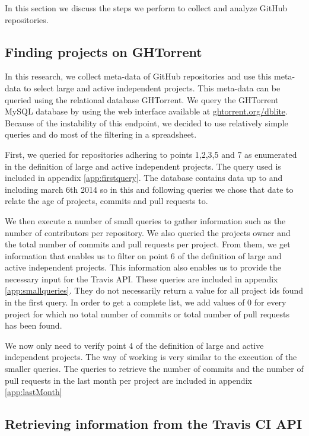 In this section we discuss the steps we perform to collect and analyze GitHub repositories.

\subsection{Finding projects on GHTorrent}
In this research, we collect meta-data of GitHub repositories and use this meta-data to select large and active independent projects.
This meta-data can be queried using the relational database GHTorrent. \cite{ghtorrent}
We query the GHTorrent MySQL database by using the web interface available at \url{ghtorrent.org/dblite}. 
Because of the instability of this endpoint, we decided to use relatively simple queries and do most of the filtering in a spreadsheet.

First, we queried for repositories adhering to points 1,2,3,5 and 7 as enumerated in the definition of large and active independent projects.
The query used is included in appendix \ref{app:firstquery}.
The database contains data up to and including march 6th 2014 so in this and following queries we chose that date to relate the age of projects, commits and pull requests to.

We then execute a number of small queries to gather information such as the number of contributors per repository. 
We also queried the projects owner and the total number of commits and pull requests per project. 
From them, we get information that enables us to filter on point 6 of the definition of large and active independent projects. 
This information also enables us to provide the necessary input for the Travis API.
These queries are included in appendix \ref{app:smallqueries}. 
They do not necessarily return a value for all project ids found in the first query.
In order to get a complete list, we add values of 0 for every project for which no total number of commits or total number of pull requests has been found.

We now only need to verify point 4 of the definition of large and active independent projects. 
The way of working is very similar to the execution of the smaller queries. 
The queries to retrieve the number of commits and the number of pull requests in the last month per project are included in appendix \ref{app:lastMonth}

\subsection{Retrieving information from the Travis CI API}

